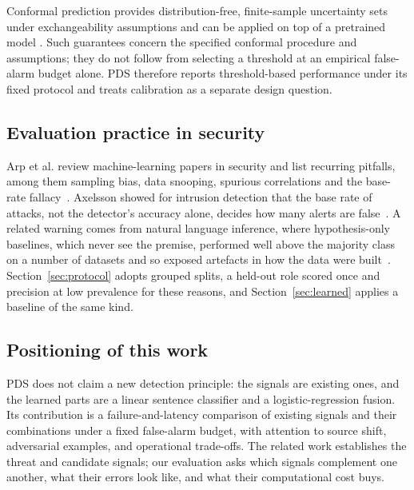 Conformal prediction provides distribution-free, finite-sample uncertainty
sets under exchangeability assumptions and can be applied on top of a
pretrained model \cite{angelopoulos2022conformal}. Such guarantees concern
the specified conformal procedure and assumptions; they do not follow from
selecting a threshold at an empirical false-alarm budget alone. PDS therefore
reports threshold-based performance under its fixed protocol and treats
calibration as a separate design question.

\subsection{Evaluation practice in security}
Arp et al. review machine-learning papers in security and list recurring
pitfalls, among them sampling bias, data snooping, spurious correlations and the
base-rate fallacy~\cite{arp2022dos}. Axelsson showed for intrusion detection that
the base rate of attacks, not the detector's accuracy alone, decides how many
alerts are false~\cite{axelsson2000base}. A related warning comes from natural
language inference, where hypothesis-only baselines, which never see the
premise, performed well above the majority class on a number of datasets and so
exposed artefacts in how the data were built~\cite{poliak2018hypothesis}.
Section~\ref{sec:protocol} adopts grouped splits, a held-out role scored once and
precision at low prevalence for these reasons, and
Section~\ref{sec:learned} applies a baseline of the same kind.

\subsection{Positioning of this work}
PDS does not claim a new detection principle: the signals are existing ones,
and the learned parts are a linear sentence classifier and a logistic-regression
fusion. Its contribution is a failure-and-latency comparison of existing signals
and their combinations under a fixed false-alarm budget, with attention to source shift, adversarial examples,
and operational trade-offs. The related work establishes the threat and
candidate signals; our evaluation asks which signals complement one another,
what their errors look like, and what their computational cost buys.